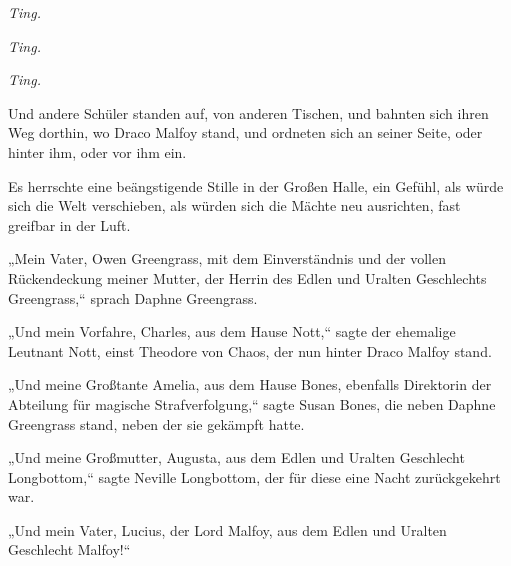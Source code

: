 \emph{Ting.}

\emph{Ting.}

\emph{Ting.}

Und andere Schüler standen auf, von anderen Tischen, und bahnten sich ihren Weg dorthin, wo Draco Malfoy stand, und ordneten sich an seiner Seite, oder hinter ihm, oder vor ihm ein.

Es herrschte eine beängstigende Stille in der Großen Halle, ein Gefühl, als würde sich die Welt verschieben, als würden sich die Mächte neu ausrichten, fast greifbar in der Luft.

„Mein Vater, Owen Greengrass, mit dem Einverständnis und der vollen Rückendeckung meiner Mutter, der Herrin des Edlen und Uralten Geschlechts Greengrass,“ sprach Daphne Greengrass.

„Und mein Vorfahre, Charles, aus dem Hause Nott,“ sagte der ehemalige Leutnant Nott, einst Theodore von Chaos, der nun hinter Draco Malfoy stand.

„Und meine Großtante Amelia, aus dem Hause Bones, ebenfalls Direktorin der Abteilung für magische Strafverfolgung,“ sagte Susan Bones, die neben Daphne Greengrass stand, neben der sie gekämpft hatte.

„Und meine Großmutter, Augusta, aus dem Edlen und Uralten Geschlecht Longbottom,“ sagte Neville Longbottom, der für diese eine Nacht zurückgekehrt war.

„Und mein Vater, Lucius, der Lord Malfoy, aus dem Edlen und Uralten Geschlecht Malfoy!“

